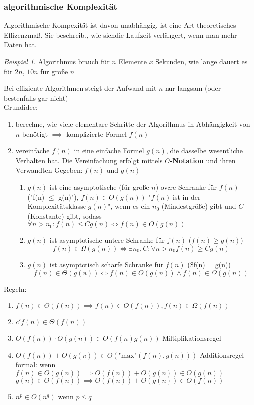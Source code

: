 \documentclass[a4paper]{scrartcl}
\DeclareMathOperator{\Exists}{\exists}%
\DeclareMathOperator{\Forall}{\forall}%
\theoremstyle{definition}
\theoremstyle{plain}
\theoremstyle{remark}
\theoremstyle{remark}
\newtheorem{ex}{Beispiel}
\begin{document}
\subsubsection{algorithmische Komplexität}
\label{sec-15-1-2}
Algorithmische Kompexität ist davon unabhängig, ist eine Art theoretisches Effizenzmaß. Sie
beschreibt, wie sichdie Laufzeit verlängert, wenn man mehr Daten hat.

\begin{ex}
Algorithmus brauch für $n$ Elemente $x$ Sekunden, wie lange dauert es für $2n$, $10n$ für große $n$
\end{ex}
Bei effiziente Algorithmen steigt der Aufwand mit $n$ nur langsam (oder bestenfalls gar nicht) \\
    Grundidee:
\begin{enumerate}
\item berechne, wie viele elementare Schritte der Algorithmus in Abhängigkeit von $n$ benötigt $\implies$ komplizierte Formel $f(n)$
\item vereinfache $f(n)$ in eine einfache Formel $g(n)$, die dasselbe wesentliche Verhalten hat. Die Vereinfachung erfolgt mittels \textbf{$O$-Notation} und ihren Verwandten
Gegeben: $f(n)$ und $g(n)$
\begin{enumerate}
\item $g(n)$ ist eine asymptotische (für große $n$) overe Schranke für $f(n)$ ("f(n) $\le$ g(n)"), $f(n) \in O(g(n))$ "$f(n)$ ist in der Komplexitätsklasse $g(n)$", wenn es ein $n_0$ (Mindestgröße) gibt
und $C$ (Konstante) gibt, sodass $\Forall n > n_0: f(n) \leq C g(n) \iff f(n) \in O(g(n))$
\item $g(n)$ ist asymptotische untere Schranke für $f(n)$ ($f(n) \geq g(n)$)
\[f(n) \in \Omega(g(n)) \iff \Exists n_0,C : \Forall n > n_0 f(n) \geq C g(n)\]
\item $g(n)$ ist asymptotisch scharfe Schranke für $f(n)$ (\$f(n) = g(n))
\[f(n) \in \Theta(g(n)) \iff f(n) \in O(g(n)) \wedge f(n) \in \Omega(g(n))\]
\end{enumerate}
\end{enumerate}
Regeln:
\begin{enumerate}
\item $f(n) \in \Theta(f(n)) \implies f(n) \in O(f(n)), f(n) \in \Omega(f(n))$
\item $c' f(n) \in \Theta(f(n))$
\item $O(f(n)) \cdot O(g(n)) \in O(f(n) g(n))$ \hfill Miltiplikationsregel
\item $O(f(n)) + O(g(n)) \in O(\text{"max"}(f(n), g(n)))$ \hfill Additionsregel \\
       formal: wenn $f(n) \in O(g(n)) \implies O(f(n)) + O(g(n)) \in O(g(n))$ \\
       $g(n) \in O(f(n)) \implies O(f(n)) + O(g(n)) \in O(f(n))$
\item $n^p \in O(n^q)$ wenn $p \leq q$
\end{enumerate}
\end{document}
